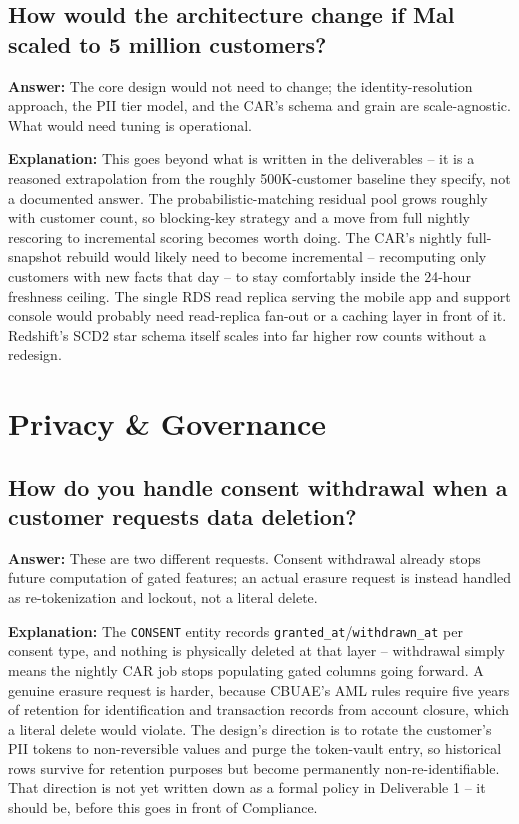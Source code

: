 \documentclass[11pt]{article}
\begin{document}
\subsection{How would the architecture change if Mal scaled to 5 million customers?}
\textbf{Answer:} The core design would not need to change; the identity-resolution approach, the PII tier model, and the CAR's schema and grain are scale-agnostic. What would need tuning is operational.

\textbf{Explanation:} This goes beyond what is written in the deliverables -- it is a reasoned extrapolation from the roughly 500K-customer baseline they specify, not a documented answer. The probabilistic-matching residual pool grows roughly with customer count, so blocking-key strategy and a move from full nightly rescoring to incremental scoring becomes worth doing. The CAR's nightly full-snapshot rebuild would likely need to become incremental -- recomputing only customers with new facts that day -- to stay comfortably inside the 24-hour freshness ceiling. The single RDS read replica serving the mobile app and support console would probably need read-replica fan-out or a caching layer in front of it. Redshift's SCD2 star schema itself scales into far higher row counts without a redesign.

\section{Privacy \& Governance}

\subsection{How do you handle consent withdrawal when a customer requests data deletion?}
\textbf{Answer:} These are two different requests. Consent withdrawal already stops future computation of gated features; an actual erasure request is instead handled as re-tokenization and lockout, not a literal delete.

\textbf{Explanation:} The \texttt{CONSENT} entity records \texttt{granted\_at}/\texttt{withdrawn\_at} per consent type, and nothing is physically deleted at that layer -- withdrawal simply means the nightly CAR job stops populating gated columns going forward. A genuine erasure request is harder, because CBUAE's AML rules require five years of retention for identification and transaction records from account closure, which a literal delete would violate. The design's direction is to rotate the customer's PII tokens to non-reversible values and purge the token-vault entry, so historical rows survive for retention purposes but become permanently non-re-identifiable. That direction is not yet written down as a formal policy in Deliverable 1 -- it should be, before this goes in front of Compliance.
\end{document}

